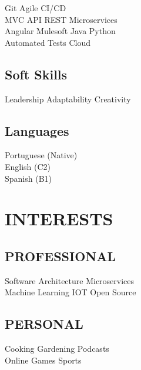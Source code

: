 \documentclass[]{deedy-resume-openfont}
\begin{document}
\begin{minipage}[t]{0.33\textwidth}


Git \textbullet{} Agile \textbullet{} CI/CD \\
MVC \textbullet{} API REST \textbullet{} Microservices \\
Angular \textbullet{} Mulesoft \textbullet{} Java \textbullet{} Python \\ 
Automated Tests \textbullet{} Cloud 
\sectionsep

\subsection{Soft Skills}
Leadership \textbullet{} Adaptability \textbullet{} Creativity
\sectionsep

\subsection{Languages}
Portuguese (Native) \\ English (C2) \\ Spanish (B1)
\sectionsep


\section{INTERESTS} 

\subsection{PROFESSIONAL}
Software Architecture \textbullet{} Microservices \\
Machine Learning \textbullet{} IOT \textbullet{} Open Source
\sectionsep

\subsection{PERSONAL}
Cooking \textbullet{} Gardening \textbullet{} Podcasts \\
Online Games \textbullet{} Sports
\sectionsep

%
%

\end{minipage} 
\end{document}

